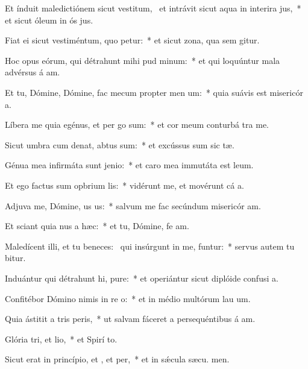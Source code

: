 \item Et índuit maledictiónem sicut vestitum,~\pscross{} et intrávit sicut aqua in interira jus,~* et sicut óleum in ós jus.
\item Fiat ei sicut vestiméntum, quo petur:~* et sicut zona, qua sem gitur.
\item Hoc opus eórum, qui détrahunt mihi pud minum:~* et qui loquúntur mala advérsus á am.
\item Et tu, Dómine, Dómine, fac mecum propter men um:~* quia suávis est misericór a.
\item Líbera me quia egénus, et per go sum:~* et cor meum conturbá  tra me.
\item Sicut umbra cum denat, abtus sum:~* et excússus sum sic tæ.
\item Génua mea infirmáta sunt  jenio:~* et caro mea immutáta est  leum.
\item Et ego factus sum opbrium lis:~* vidérunt me, et movérunt cá a.
\item Adjuva me, Dómine, us us:~* salvum me fac secúndum misericór am.
\item Et sciant quia nus a hæc:~* et tu, Dómine, fe am.
\item Maledícent illi, et tu beneces:~\pscross{} qui insúrgunt in me, funtur:~* servus autem tu bitur.
\item Induántur qui détrahunt hi, pure:~* et operiántur sicut diplóide confusi a.
\item Confitébor Dómino nimis in re o:~* et in médio multórum lau um.
\item Quia ástitit a tris peris,~* ut salvam fáceret a persequéntibus á am.
\item Glória tri, et lio,~* et Spirí to.
\item Sicut erat in princípio, et , et per,~* et in sǽcula sæcu. men.
